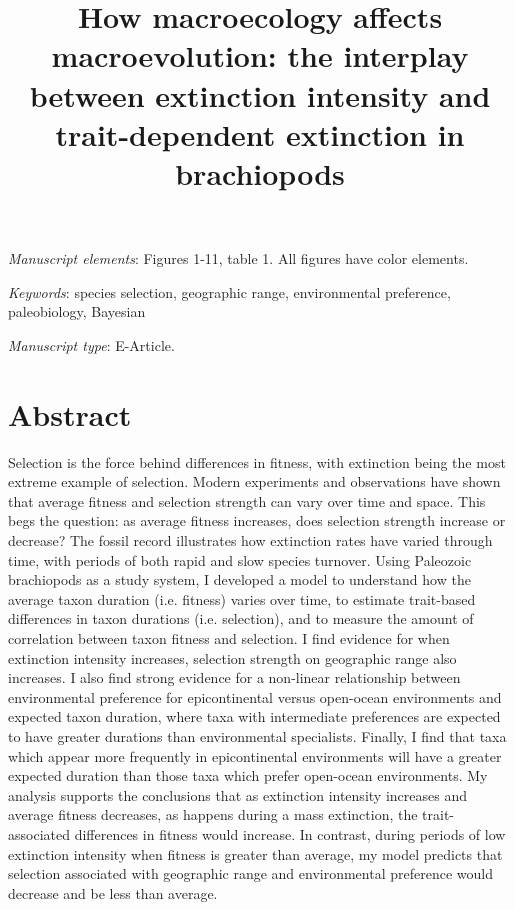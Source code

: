 \documentclass[11pt]{article}
\title{How macroecology affects macroevolution: the interplay between extinction intensity and trait-dependent extinction in brachiopods}
\date{}
\begin{document}
\maketitle



\bigskip

\textit{Manuscript elements}: Figures 1-11, table 1. All figures have color elements.

\bigskip

\textit{Keywords}: species selection, geographic range, environmental preference, paleobiology, Bayesian

\bigskip

\textit{Manuscript type}: E-Article.

\bigskip


\linenumbers{}
\modulolinenumbers[3]

\newpage{}

\section*{Abstract}

Selection is the force behind differences in fitness, with extinction being the most extreme example of selection. Modern experiments and observations have shown that average fitness and selection strength can vary over time and space. This begs the question: as average fitness increases, does selection strength increase or decrease? The fossil record illustrates how extinction rates have varied through time, with periods of both rapid and slow species turnover. Using Paleozoic brachiopods as a study system, I developed a model to understand how the average taxon duration (i.e. fitness) varies over time, to estimate trait-based differences in taxon durations (i.e. selection), and to measure the amount of correlation between taxon fitness and selection. I find evidence for when extinction intensity increases, selection strength on geographic range also increases. I also find strong evidence for a non-linear relationship between environmental preference for epicontinental versus open-ocean environments and expected taxon duration, where taxa with intermediate preferences are expected to have greater durations than environmental specialists. Finally, I find that taxa which appear more frequently in epicontinental environments will have a greater expected duration than those taxa which prefer open-ocean environments. My analysis supports the conclusions that as extinction intensity increases and average fitness decreases, as happens during a mass extinction, the trait-associated differences in fitness would increase. In contrast, during periods of low extinction intensity when fitness is greater than average, my model predicts that selection associated with geographic range and environmental preference would decrease and be less than average.
\end{document}
